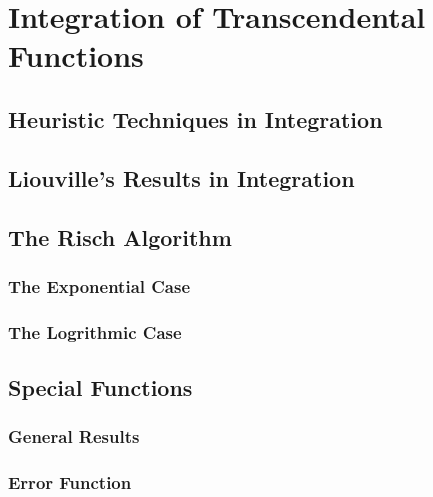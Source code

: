 \chapter{Integration of Transcendental Functions}

\section{Heuristic Techniques in Integration}

\section{Liouville's Results in Integration}

\section{The Risch Algorithm}

\subsection{The Exponential Case}

\subsection{The Logrithmic Case}

\section{Special Functions}

\subsection{General Results}

\subsection{Error Function}


